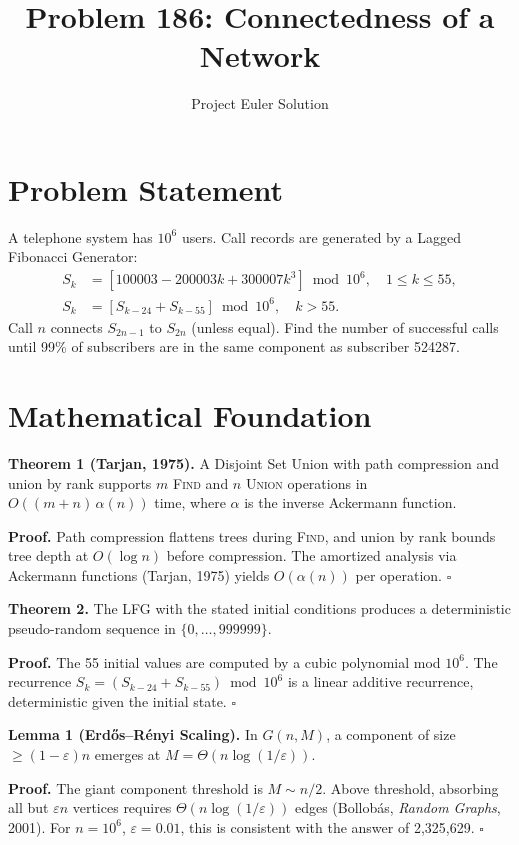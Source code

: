 \documentclass[12pt]{article}
\title{Problem 186: Connectedness of a Network}
\author{Project Euler Solution}
\date{}
\begin{document}
\maketitle

\section{Problem Statement}
A telephone system has $10^6$ users. Call records are generated by a Lagged Fibonacci Generator:
\begin{align}
S_k &= [100003 - 200003k + 300007k^3] \bmod 10^6, \quad 1 \le k \le 55, \\
S_k &= [S_{k-24} + S_{k-55}] \bmod 10^6, \quad k > 55.
\end{align}
Call $n$ connects $S_{2n-1}$ to $S_{2n}$ (unless equal). Find the number of successful calls until 99\% of subscribers are in the same component as subscriber 524287.

\section{Mathematical Foundation}

\textbf{Theorem 1 (Tarjan, 1975).} A Disjoint Set Union with path compression and union by rank supports $m$ \textsc{Find} and $n$ \textsc{Union} operations in $O((m+n)\,\alpha(n))$ time, where $\alpha$ is the inverse Ackermann function.

\textbf{Proof.} Path compression flattens trees during \textsc{Find}, and union by rank bounds tree depth at $O(\log n)$ before compression. The amortized analysis via Ackermann functions (Tarjan, 1975) yields $O(\alpha(n))$ per operation. $\square$

\medskip

\textbf{Theorem 2.} The LFG with the stated initial conditions produces a deterministic pseudo-random sequence in $\{0, \ldots, 999999\}$.

\textbf{Proof.} The 55 initial values are computed by a cubic polynomial mod $10^6$. The recurrence $S_k = (S_{k-24} + S_{k-55}) \bmod 10^6$ is a linear additive recurrence, deterministic given the initial state. $\square$

\medskip

\textbf{Lemma 1 (Erd\H{o}s--R\'enyi Scaling).} In $G(n, M)$, a component of size $\geq (1-\varepsilon)n$ emerges at $M = \Theta(n \log(1/\varepsilon))$.

\textbf{Proof.} The giant component threshold is $M \sim n/2$. Above threshold, absorbing all but $\varepsilon n$ vertices requires $\Theta(n \log(1/\varepsilon))$ edges (Bollob\'as, \emph{Random Graphs}, 2001). For $n = 10^6$, $\varepsilon = 0.01$, this is consistent with the answer of 2,325,629. $\square$
\end{document}
